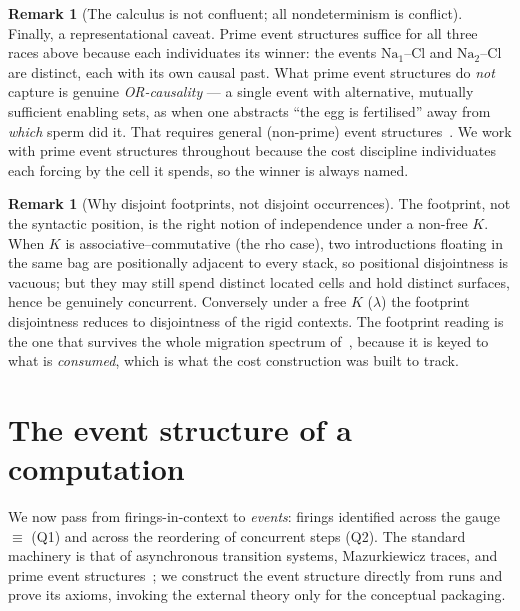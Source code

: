 \documentclass[11pt]{article}
\theoremstyle{definition}
\newtheorem{remark}[definition]{Remark}
\theoremstyle{plain}
\newcommand{\Seq}{\equiv}
\theoremstyle{remark}
\begin{document}
\begin{remark}[The calculus is not confluent; all nondeterminism is conflict]
Finally, a representational caveat. Prime event structures suffice for
all three races above because each individuates its winner: the events
$\mathrm{Na}_1\text{--}\mathrm{Cl}$ and $\mathrm{Na}_2\text{--}
\mathrm{Cl}$ are distinct, each with its own causal past. What prime
event structures do \emph{not} capture is genuine \emph{OR-causality}
--- a single event with alternative, mutually sufficient enabling sets,
as when one abstracts ``the egg is fertilised'' away from \emph{which}
sperm did it. That requires general (non-prime) event
structures~\cite{WinskelNielsen}. We work with prime event structures
throughout because the cost discipline individuates each forcing by the
cell it spends, so the winner is always named.
\end{remark}

\begin{remark}[Why disjoint footprints, not disjoint occurrences]
The footprint, not the syntactic position, is the right notion of
independence under a non-free $K$. When $K$ is associative--commutative
(the rho case), two introductions floating in the same bag are
positionally adjacent to every stack, so positional disjointness is
vacuous; but they may still spend distinct located cells and hold
distinct surfaces, hence be genuinely concurrent. Conversely under a free
$K$ ($\lambda$) the footprint disjointness reduces to disjointness of the
rigid contexts. The footprint reading is the one that survives the whole
migration spectrum of~\cite{CostNote}, because it is keyed to what is
\emph{consumed}, which is what the cost construction was built to track.
\end{remark}

\section{The event structure of a computation}
\label{sec:events}

We now pass from firings-in-context to \emph{events}: firings identified
across the gauge $\Seq$ (Q1) and across the reordering of concurrent
steps (Q2). The standard machinery is that of asynchronous transition
systems, Mazurkiewicz traces, and prime event
structures~\cite{NPW,WinskelES,WinskelNielsen,Mazurkiewicz,Bednarczyk};
we construct the event structure directly from runs and prove its axioms,
invoking the external theory only for the conceptual packaging.
\end{document}
